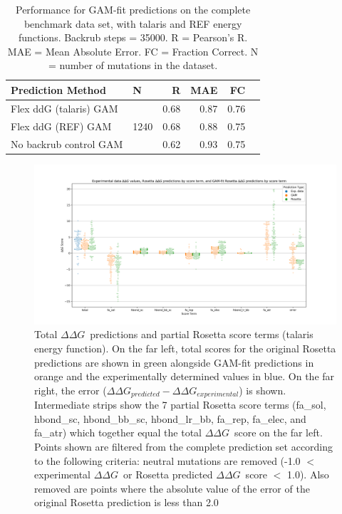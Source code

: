 \documentclass[journal=jpcbfk,manuscript=suppinfo]{achemso}
\newcommand\ddg{$\Delta\Delta G$}
\begin{document}
\begin{table}
  \begin{tabular}{llrrrr}
\toprule
Prediction Method &     N &    R &  MAE &   FC \\
\midrule
 Flex ddG (talaris) GAM & \multirow{ 4}{*}{1240} & 0.68 & 0.87 & 0.76 \\
 Flex ddG (REF) GAM & & 0.68 & 0.88 & 0.75  \\
 No backrub control GAM & & 0.62 & 0.93 & 0.75  \\
\bottomrule
\end{tabular}
  \caption[]{
    Performance for GAM-fit predictions on the complete benchmark data set, with talaris\cite{song_structure-guided_2011,shapovalov_smoothed_2011,omeara_combined_2015} and REF\cite{alford_rosetta_2017} energy functions. Backrub steps = 35000. R = Pearson's R. MAE = Mean Absolute Error. FC = Fraction Correct. N = number of mutations in the dataset.
  } \label{tab:table-gam-fit}
\end{table}

\begin{figure}
  \includegraphics[width=\textwidth,keepaspectratio]{figures/tal-GAM-terms-mpl.png}
  \caption[]{
    Total \ddg\ predictions and partial Rosetta score terms (talaris energy function\cite{song_structure-guided_2011,shapovalov_smoothed_2011,omeara_combined_2015}). On the far left, total scores for the original Rosetta predictions are shown in green alongside GAM-fit predictions in orange and the experimentally determined values in blue. On the far right, the error ($\Delta\Delta G_{predicted} - \Delta\Delta G_{experimental}$) is shown. Intermediate strips show the 7 partial Rosetta score terms (fa\_sol, hbond\_sc, hbond\_bb\_sc, hbond\_lr\_bb, fa\_rep, fa\_elec, and fa\_atr) which together equal the total \ddg\ score on the far left.
    Points shown are filtered from the complete prediction set according to the following criteria: neutral mutations are removed (-1.0 $<$ experimental \ddg\ or Rosetta predicted \ddg\ score $<$ 1.0). Also removed are points where the absolute value of the error of the original Rosetta prediction is less than 2.0
  } \label{fig:tal-GAM-terms-mpl}
\end{figure}
\end{document}
